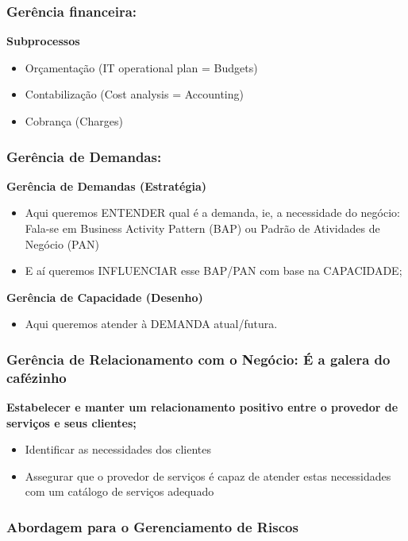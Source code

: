 \subsubsection{Gerência financeira:}

\textbf{Subprocessos}
\begin{itemize}
	\item Orçamentação (IT operational plan = Budgets)
	\item Contabilização (Cost analysis = Accounting)
	\item Cobrança (Charges)
\end{itemize}

\subsubsection{Gerência de Demandas:}


\textbf{Gerência de Demandas (Estratégia)}
\begin{itemize}
	\item Aqui queremos ENTENDER qual é a demanda, ie, a necessidade do negócio: Fala-se em Business Activity Pattern (BAP) ou Padrão de Atividades de Negócio (PAN)
	\item E aí queremos INFLUENCIAR esse BAP/PAN com base na CAPACIDADE;
\end{itemize}

\textbf{Gerência de Capacidade (Desenho)}
\begin{itemize}
	\item Aqui queremos atender à DEMANDA atual/futura.
\end{itemize}

\subsubsection{Gerência de Relacionamento com o Negócio: É a galera do cafézinho}

\textbf{Estabelecer e manter um relacionamento positivo entre o provedor de serviços e seus clientes;}
\begin{itemize}
	\item Identificar as necessidades dos clientes
	\item Assegurar que o provedor de serviços é capaz de atender estas necessidades com um catálogo de serviços adequado
\end{itemize}

\subsubsection{Abordagem para o Gerenciamento de Riscos}

